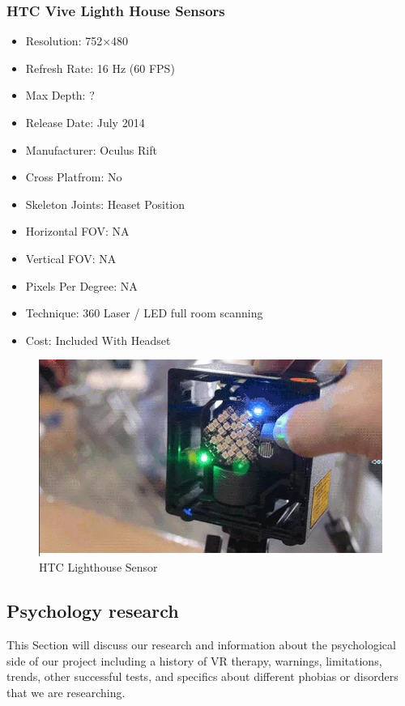 \documentclass[a4paper,10pt]{article}
\begin{document}
	\subsubsection{HTC Vive Lighth House Sensors}
\begin{itemize}
  \item Resolution: 752×480
  \item Refresh Rate: 16 Hz (60 FPS)
  \item Max Depth: ?
  \item Release Date: July 2014
  \item Manufacturer: Oculus Rift
  \item Cross Platfrom: No
  \item Skeleton Joints: Heaset Position
  \item Horizontal FOV: NA
  \item Vertical FOV: NA
  \item Pixels Per Degree: NA
  \item Technique: 360 Laser / LED full room scanning 
  \item Cost: Included With Headset
\end{itemize}
\begin{figure}[H]
	\includegraphics[width=\linewidth,height=\paperheight,keepaspectratio]{viveLight.jpg}
	\caption{HTC Lighthouse Sensor}
	\label{fig:viveCam}
	\end{figure}
	\pagebreak

\subsection {Psychology research}
This Section will discuss our research and information about the psychological side of our project including a history of VR therapy, warnings, limitations, trends, other successful tests, and specifics about different phobias or disorders that we are researching. 
\end{document}
